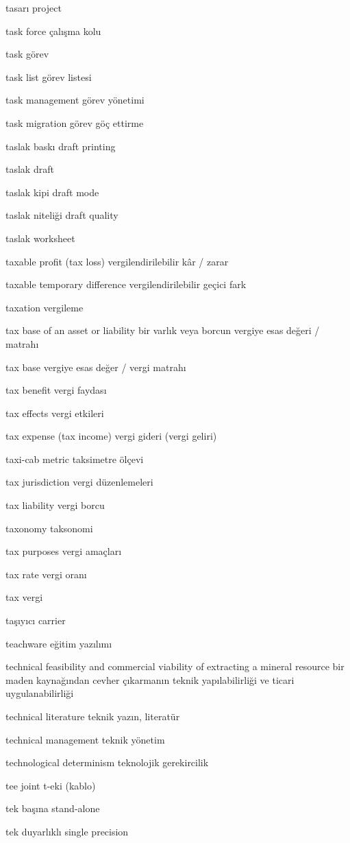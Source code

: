 \documentclass[12pt,fleqn]{article}\usepackage{../../common}
\begin{document}
tasarı project

task force çalışma kolu

task görev

task list görev listesi

task management görev yönetimi

task migration görev göç ettirme

taslak baskı draft printing

taslak draft

taslak kipi draft mode

taslak niteliği draft quality

taslak worksheet

taxable profit (tax loss) vergilendirilebilir kâr / zarar

taxable temporary difference vergilendirilebilir geçici fark

taxation vergileme

tax base of an asset or liability bir varlık veya borcun vergiye esas değeri / matrahı

tax base vergiye esas değer / vergi matrahı

tax benefit vergi faydası

tax effects vergi etkileri

tax expense (tax income) vergi gideri (vergi geliri)

taxi-cab metric taksimetre ölçevi

tax jurisdiction vergi düzenlemeleri

tax liability vergi borcu

taxonomy taksonomi

tax purposes vergi amaçları

tax rate vergi oranı

tax vergi

taşıyıcı carrier

teachware eğitim yazılımı

technical feasibility and commercial viability of extracting a mineral resource bir maden kaynağından cevher çıkarmanın teknik yapılabilirliği ve ticari uygulanabilirliği

technical literature teknik yazın, literatür

technical management teknik yönetim

technological determinism teknolojik gerekircilik

tee joint t-eki (kablo)

tek başına stand-alone

tek duyarlıklı single precision
\end{document}
